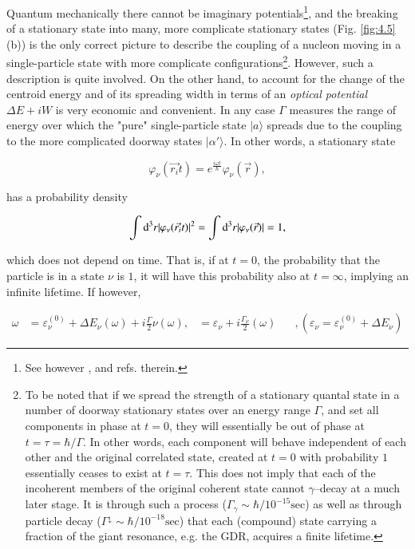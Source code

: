 Quantum mechanically there cannot be imaginary potentials\footnote{See however \cite{Caldeira:81}, \cite{Caldeira:83} and refs. therein.}, and the breaking of a stationary state into many, more complicate stationary states (Fig. \ref{fig:4.5}(b)) is the only correct picture to describe the coupling of a nucleon moving in a single-particle state with more complicate configurations\footnote{To be noted that if we spread the strength of a stationary quantal state in a number of doorway stationary states over an energy range $\Gamma$, and set all components in phase at $t=0$, they will essentially be out of phase at $t=\tau = \hbar/\Gamma$. In other words, each component will behave independent of each other and the original correlated state, created at $t=0$ with probability $1$ essentially ceases to exist at $t=\tau$. This does not imply that each of the incoherent members of the original coherent state cannot $\gamma$--decay at a much later stage. It is through such a process ($\Gamma_\gamma\sim\hbar/10^{-15}\text{sec}$) as well as through particle decay ($\Gamma^\downarrow\sim\hbar/10^{-18}\text{sec}$) that each (compound) state carrying a fraction of the giant resonance, e.g. the GDR, acquires a finite lifetime.}. However, such a description is quite involved. On the other hand, to account for the change of the centroid energy and of its spreading width in terms of an {\it optical potential $\Delta E + iW$} is very economic and convenient. In any case $\Gamma$ measures the range of energy over which the "pure" single-particle state $|a\rangle$ spreads due to the coupling to the more complicated doorway states $|\alpha'\rangle$. In other words, a stationary state

\begin{equation}
\varphi_{\nu}(\vec{r_i}t) = e^{\frac{i\omega t}{\hbar}} \varphi_{\nu}(\vec{r}) ,
\label{eqn:43}
\end{equation}

\noindent has a probability density

\begin{equation}
\int{\rm d}^3 r |\varphi_{\nu}(\vec{r_i}t)|^2 = \int{\rm d}^3 r |\varphi_{\nu}(\vec{r})| = 1 ,
\label{eqn:44}
\end{equation}

\noindent which does not depend on time. That is, if at $t=0$, the probability that the particle is in a state $\nu$ is $1$, it will have this probability also at $t=\infty$, implying an infinite lifetime. If however,

\begin{eqnarray}
\nonumber
\omega &= \varepsilon_{\nu}^{(0)} + \Delta E_{\nu}(\omega) + i \frac{\Gamma}{2} \nu(\omega),
\nonumber
&= \varepsilon_{\nu} + i \frac{\Gamma_{\nu}}{2}(\omega) \;\;\;\;\;\; , (\varepsilon_{\nu} = \varepsilon_{\nu}^{(0)} + \Delta E_{\nu})
\end{eqnarray}

